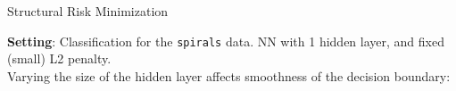 \documentclass[11pt,compress,t,notes=noshow, xcolor=table]{beamer}
\begin{document}
\begin{frame} {Structural Risk Minimization}

\small

\textbf{Setting}: Classification for the \texttt{spirals} data.
NN with 1 hidden layer, and fixed (small) L2 penalty. \\
Varying the size of the hidden layer affects smoothness of the decision boundary:


\vfill


\end{frame}
\end{document}
